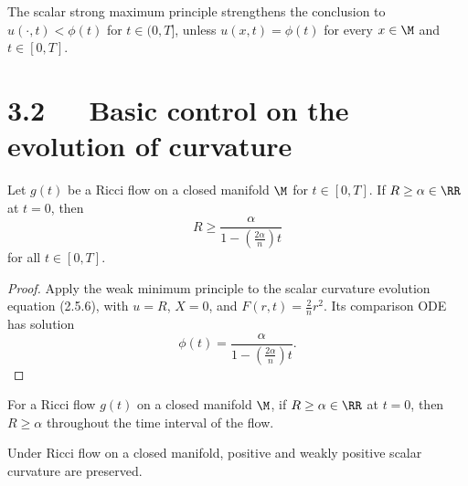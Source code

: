 \begin{remark}
\label{topping-maxpr-strong-maximum-principle}
The scalar strong maximum principle strengthens the conclusion to
$u(\cdot,t)<\phi(t)$ for $t\in(0,T]$, unless
$u(x,t)=\phi(t)$ for every $x\in\M$ and $t\in[0,T]$.
\end{remark}

\section*{3.2\ \ \ Basic control on the evolution of curvature}

\begin{theorem}
\label{topping-maxpr-scalar-lower-bound}

Let $g(t)$ be a Ricci flow on a closed manifold $\M$ for $t\in[0,T]$. If
$R\geq\alpha\in\RR$ at $t=0$, then
\[
R\geq\frac{\alpha}{1-\left(\frac{2\alpha}{n}\right)t}
\]
for all $t\in[0,T]$.
\end{theorem}

\begin{proof}
\sketch Apply the weak minimum principle to the scalar curvature evolution
equation (2.5.6), with $u=R$, $X=0$, and $F(r,t)=\frac{2}{n}r^2$. Its
comparison ODE has solution
\[
\phi(t)=\frac{\alpha}{1-\left(\frac{2\alpha}{n}\right)t}.
\]
\end{proof}

\begin{corollary}
\label{topping-maxpr-scalar-preserved}
For a Ricci flow $g(t)$ on a closed manifold $\M$, if $R\geq\alpha\in\RR$ at
$t=0$, then $R\geq\alpha$ throughout the time interval of the flow.
\end{corollary}

\begin{corollary}
\label{topping-maxpr-positive-scalar-preserved}
Under Ricci flow on a closed manifold, positive and weakly positive scalar
curvature are preserved.
\end{corollary}

